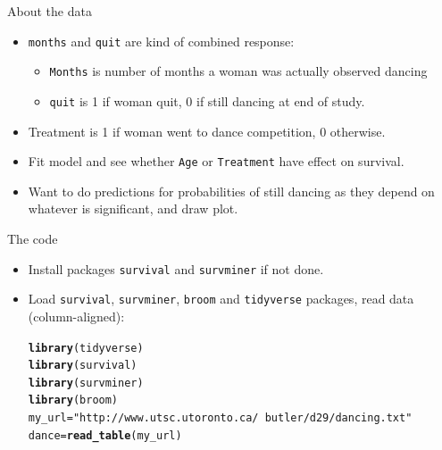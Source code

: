 \documentclass[unknownkeysallowed]{beamer}\usepackage[]{graphicx}\usepackage[]{color}
\makeatletter
\newcommand{\hlstr}[1]{\textcolor[rgb]{0.192,0.494,0.8}{#1}}%
\newcommand{\hlstd}[1]{\textcolor[rgb]{0.345,0.345,0.345}{#1}}%
\newcommand{\hlkwb}[1]{\textcolor[rgb]{0.69,0.353,0.396}{#1}}%
\newcommand{\hlkwd}[1]{\textcolor[rgb]{0.737,0.353,0.396}{\textbf{#1}}}%
\newenvironment{kframe}{%
 \def\at@end@of@kframe{}%
 \ifinner\ifhmode%
  \def\at@end@of@kframe{\end{minipage}}%
  \begin{minipage}{\columnwidth}%
 \fi\fi%
 \def\FrameCommand##1{\hskip\@totalleftmargin \hskip-\fboxsep
 \colorbox{shadecolor}{##1}\hskip-\fboxsep
     \hskip-\linewidth \hskip-\@totalleftmargin \hskip\columnwidth}%
 \MakeFramed {\advance\hsize-\width
   \@totalleftmargin\z@ \linewidth\hsize
   \@setminipage}}%
 {\par\unskip\endMakeFramed%
 \at@end@of@kframe}
\newenvironment{knitrout}{}{} %
\makeatother
\begin{document}
\begin{frame}[fragile]{About the data}

  \begin{itemize}
  \item \verb-months- and \verb-quit- are kind of combined response:
    \begin{itemize}
    \item  \verb-Months- is number of months a woman was actually observed dancing
    \item \verb-quit- is 1 if woman quit, 0 if still dancing at end of study.
    \end{itemize}
  \item Treatment is 1 if woman went to dance competition, 0 otherwise.
  \item Fit model and see whether \texttt{Age} or \texttt{Treatment}
    have effect on survival.
  \item Want to do predictions for probabilities of still dancing as
    they depend on whatever is significant, and draw plot.
\end{itemize}
\end{frame}


\begin{frame}[fragile]{The code}

  \begin{itemize}
  \item Install packages \texttt{survival} and \texttt{survminer} if not done. 
  \item Load \texttt{survival}, \texttt{survminer},
    \texttt{broom} and \texttt{tidyverse}
    packages, read data (column-aligned):
 

\begin{knitrout}
\color{fgcolor}\begin{kframe}
\begin{alltt}
\hlkwd{library}\hlstd{(tidyverse)}
\hlkwd{library}\hlstd{(survival)}
\hlkwd{library}\hlstd{(survminer)}
\hlkwd{library}\hlstd{(broom)}
\hlstd{my_url}\hlkwb{=}\hlstr{"http://www.utsc.utoronto.ca/~butler/d29/dancing.txt"}
\hlstd{dance}\hlkwb{=}\hlkwd{read_table}\hlstd{(my_url)}
\end{alltt}
\end{kframe}
\end{knitrout}

    


  \end{itemize}

\end{frame}
\end{document}
